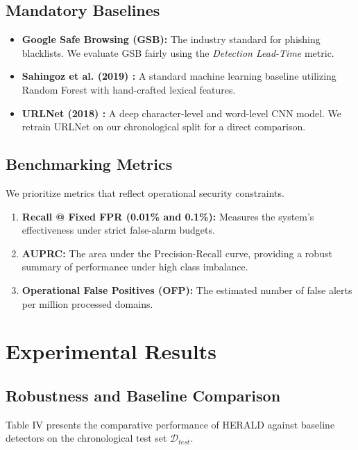 \documentclass[journal]{IEEEtran}
\begin{document}
\subsection{Mandatory Baselines}
\begin{itemize}
    \item \textbf{Google Safe Browsing (GSB):} The industry standard for phishing blacklists. We evaluate GSB fairly using the \textit{Detection Lead-Time} metric.
    \item \textbf{Sahingoz et al. (2019) \cite{sahingoz2019}:} A standard machine learning baseline utilizing Random Forest with hand-crafted lexical features.
    \item \textbf{URLNet (2018) \cite{le2018}:} A deep character-level and word-level CNN model. We retrain URLNet on our chronological split for a direct comparison.
\end{itemize}

\subsection{Benchmarking Metrics}
We prioritize metrics that reflect operational security constraints.
\begin{enumerate}
    \item \textbf{Recall @ Fixed FPR (0.01\% and 0.1\%):} Measures the system's effectiveness under strict false-alarm budgets.
    \item \textbf{AUPRC:} The area under the Precision-Recall curve, providing a robust summary of performance under high class imbalance.
    \item \textbf{Operational False Positives (OFP):} The estimated number of false alerts per million processed domains.
\end{enumerate}

\section{Experimental Results}
\subsection{Robustness and Baseline Comparison}
Table IV presents the comparative performance of HERALD against baseline detectors on the chronological test set $\mathcal{D}_{test}$. 
\end{document}
